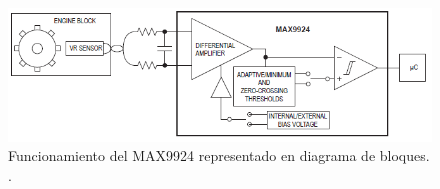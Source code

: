 \begin{figure}[htpb]
\centering
\includegraphics[width=.9\textwidth]{./Figures/max9924.png}
\caption{Funcionamiento del MAX9924 representado en diagrama de bloques. \protect\footnotemark[4].}
\label{fig:bloq-rpm}
\end{figure}
